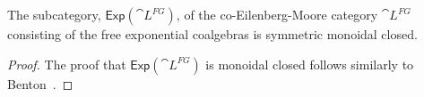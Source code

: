 \begin{corollary}
  The subcategory, $\mathsf{Exp}(\cat{L}^{FG})$, of the
  co-Eilenberg-Moore category $\cat{L}^{FG}$ consisting of the free
  exponential coalgebras is symmetric monoidal closed.
\end{corollary}
\begin{proof}
  The proof that $\mathsf{Exp}(\cat{L}^{FG})$ is monoidal closed
  follows similarly to Benton~\cite{Benton:1994}.
\end{proof}

